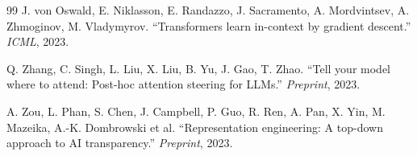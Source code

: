 \documentclass[11pt]{article}
\theoremstyle{definition}
\begin{document}
\begin{thebibliography}{99}
J. von Oswald, E. Niklasson, E. Randazzo, J. Sacramento, A. Mordvintsev, A. Zhmoginov, M. Vladymyrov.
``Transformers learn in-context by gradient descent.''
\emph{ICML}, 2023.

Q. Zhang, C. Singh, L. Liu, X. Liu, B. Yu, J. Gao, T. Zhao.
``Tell your model where to attend: Post-hoc attention steering for LLMs.''
\emph{Preprint}, 2023.

A. Zou, L. Phan, S. Chen, J. Campbell, P. Guo, R. Ren, A. Pan, X. Yin, M. Mazeika, A.-K. Dombrowski et al.
``Representation engineering: A top-down approach to AI transparency.''
\emph{Preprint}, 2023.

\end{thebibliography}
\end{document}
